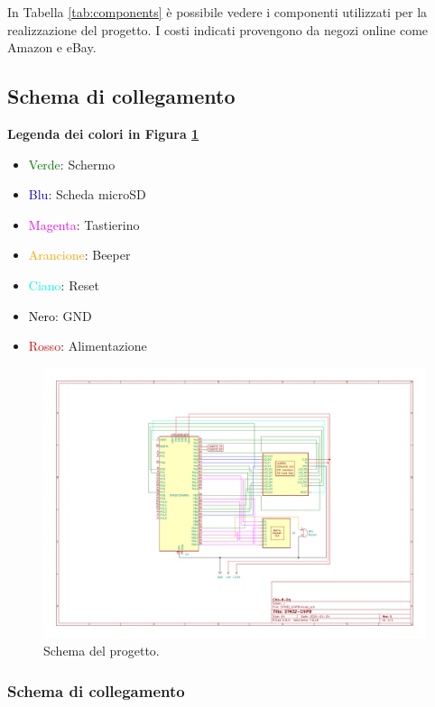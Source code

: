 \documentclass[a4paper]{article}
\begin{document}
In Tabella \ref{tab:components} è possibile vedere i componenti utilizzati per la
realizzazione del progetto. I costi indicati provengono da negozi online come Amazon e eBay.

\subsection{Schema di collegamento}

\textbf{Legenda dei colori in Figura \ref{fig:schema}}

\begin{itemize}
    \item \textcolor{green}{Verde}: Schermo
    \item \textcolor{blue}{Blu}: Scheda microSD
    \item \textcolor{magenta}{Magenta}: Tastierino
    \item \textcolor{orange}{Arancione}: Beeper
    \item \textcolor{cyan}{Ciano}: Reset
    \item \textcolor{black}{Nero}: GND
    \item \textcolor{red}{Rosso}: Alimentazione
\end{itemize}

\begin{figure}[h!t]
    \begin{center}
        \includegraphics[scale=0.50]{figures/STM32_CHIP8.pdf}
    \end{center}
    \caption{
        Schema del progetto.
    }
    \label{fig:schema}
\end{figure}

\subsubsection{Schema di collegamento}\label{subsubsec:collegamenti}
\end{document}
